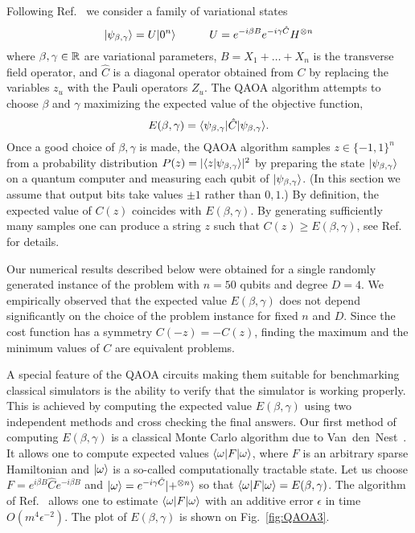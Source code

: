 Following Ref.~\cite{farhi2014quantum} we
consider a family of variational states
\[
|\psi_{\beta,\gamma}\rangle = U|0^n\rangle  \qquad \quad U=e^{-i\beta  B} e^{-i\gamma \hat{C}} H^{\otimes n}
\]
where  $\beta,\gamma\in \mathbb{R}$ are variational parameters,
$B=X_1+\ldots+X_n$ is the transverse field operator,
and $\hat{C}$ is a diagonal operator obtained from $C$
by replacing the variables $z_u$ with the Pauli operators $Z_u$. 
The QAOA algorithm attempts to choose $\beta$ and $\gamma$  maximizing
the expected value of the objective function,
\[
E(\beta,\gamma)=\langle \psi_{\beta,\gamma} |\hat{C}|\psi_{\beta,\gamma}\rangle.
\]
Once a good choice of $\beta,\gamma$ is made, the QAOA algorithm
samples  $z\in \{-1,1\}^n$  from a probability distribution
$P(z)=|\langle z|\psi_{\beta,\gamma}\rangle|^2$ by 
preparing the state $|\psi_{\beta,\gamma}\rangle$ on a quantum computer 
and measuring each qubit of 
$|\psi_{\beta,\gamma}\rangle$.
(In this section we assume that output bits take values $\pm 1$ rather than $0,1$.)
By definition, the expected value of $C(z)$  coincides with $E(\beta,\gamma)$.
By generating sufficiently many samples one can produce a string $z$ such that
$C(z)\ge E(\beta,\gamma)$, see Ref.~\cite{farhi2014quantum} for details.

Our numerical results described  below were obtained for 
a single randomly generated instance of the problem with $n=50$ qubits and degree $D=4$.
We empirically observed that the expected value   $E(\beta,\gamma)$ does not depend significantly
on the choice of the problem instance for fixed $n$ and $D$.
Since the cost function has a symmetry $C(-z)=-C(z)$, finding the maximum and the minimum
values of $C$ are equivalent problems. 

A special feature of the QAOA circuits making them suitable
for benchmarking classical simulators is the ability to verify  that the simulator is working properly.
This is achieved by  computing the expected value $E(\beta,\gamma)$ using two independent
methods and cross checking the final answers. Our first method of computing $E(\beta,\gamma)$ is 
 a classical Monte Carlo algorithm due to Van~den~Nest~\cite{nest2009simulating}. 
It allows one to compute expected values
$\langle \omega |F|\omega\rangle$, where $F$ is an arbitrary sparse Hamiltonian
and $|\omega\rangle$ is a so-called computationally tractable state.
Let us choose  $F=e^{i\beta B} \hat{C} e^{-i\beta B}$
and $|\omega\rangle=e^{-i\gamma \hat{C}}|+^{\otimes n}\rangle$
so that $\langle \omega |F|\omega\rangle=E(\beta,\gamma)$.
The algorithm of Ref.~\cite{nest2009simulating}
allows one to estimate $\langle \omega |F|\omega\rangle$
with an additive error $\epsilon$ in time $O(m^4 \epsilon^{-2})$.
The plot of $E(\beta,\gamma)$  is shown on Fig.~\ref{fig:QAOA3}.


